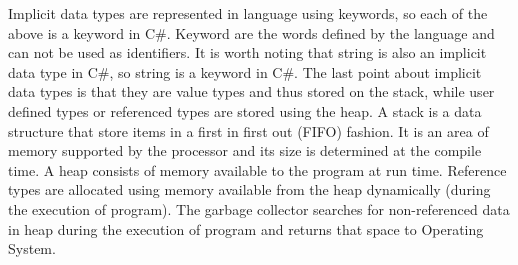 Implicit data types are represented in language using keywords, so each of the above is a keyword in C\#. Keyword
are the words defined by the language and can not be used as identifiers. It is worth noting that string is also an
implicit data type in C\#, so string is a keyword in C\#. The last point about implicit data types is that they are value
types and thus stored on the stack, while user defined types or referenced types are stored using the heap. A stack is
a data structure that store items in a first in first out (FIFO) fashion. It is an area of memory supported by the
processor and its size is determined at the compile time. A heap consists of memory available to the program at run
time. Reference types are allocated using memory available from the heap dynamically (during the execution of
program). The garbage collector searches for non-referenced data in heap during the execution of program and
returns that space to Operating System.\\